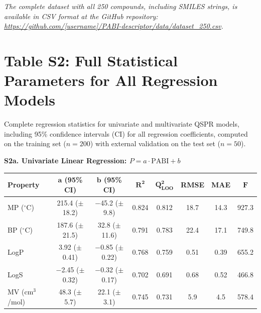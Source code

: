 \documentclass[12pt,a4paper]{article}
\begin{document}
\noindent\textit{The complete dataset with all 250 compounds, including SMILES strings, is available in CSV format at the GitHub repository: \url{https://github.com/[username]/PABI-descriptor/data/dataset\_250.csv}.}

\newpage

\section*{Table S2: Full Statistical Parameters for All Regression Models}

\noindent Complete regression statistics for univariate and multivariate QSPR models, including 95\% confidence intervals (CI) for all regression coefficients, computed on the training set ($n = 200$) with external validation on the test set ($n = 50$).

\vspace{0.5cm}

\noindent\textbf{S2a. Univariate Linear Regression: $P = a \cdot \text{PABI} + b$}

\vspace{0.3cm}

\begin{table}[H]
\centering
\begin{tabular}{@{}lccccccc@{}}
\toprule
\textbf{Property} & $\mathbf{a}$ \textbf{(95\% CI)} & $\mathbf{b}$ \textbf{(95\% CI)} & $\mathbf{R^2}$ & $\mathbf{Q^2_{\text{LOO}}}$ & \textbf{RMSE} & \textbf{MAE} & $\mathbf{F}$ \\
\midrule
MP ($^{\circ}$C) & 215.4 ($\pm$18.2) & $-$45.2 ($\pm$9.8) & 0.824 & 0.812 & 18.7 & 14.3 & 927.3 \\
BP ($^{\circ}$C) & 187.6 ($\pm$21.5) & 32.8 ($\pm$11.6) & 0.791 & 0.783 & 22.4 & 17.1 & 749.8 \\
LogP & 3.92 ($\pm$0.41) & $-$0.85 ($\pm$0.22) & 0.768 & 0.759 & 0.51 & 0.39 & 655.2 \\
LogS & $-$2.45 ($\pm$0.32) & $-$0.32 ($\pm$0.17) & 0.702 & 0.691 & 0.68 & 0.52 & 466.8 \\
MV (cm$^3$/mol) & 48.3 ($\pm$5.7) & 22.1 ($\pm$3.1) & 0.745 & 0.731 & 5.9 & 4.5 & 578.4 \\
\bottomrule
\end{tabular}
\end{table}

\vspace{0.5cm}
\end{document}
